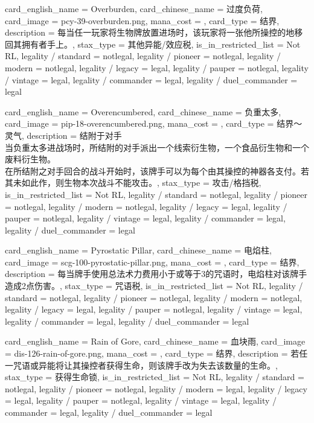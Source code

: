 \documentclass[lang = cn, color = black, 10pt]{AllThatStax}
\begin{document}
\card
{
	card_english_name = {Overburden},
	card_chinese_name = {过度负荷},
	card_image = pcy-39-overburden.png,
	mana_cost = ,
	card_type = 结界,
	description = {每当任一玩家将生物牌放置进场时，该玩家将一张他所操控的地移回其拥有者手上。},
	stax_type = 其他异能/效应税,
	is_in_restricted_list = Not RL,
	legality / standard = notlegal,
	legality / pioneer = notlegal,
	legality / modern = notlegal,
	legality / legacy = legal,
	legality / pauper = notlegal,
	legality / vintage = legal,
	legality / commander = legal,
	legality / duel_commander = legal
}

\card
{
	card_english_name = {Overencumbered},
	card_chinese_name = {负重太多},
	card_image = pip-18-overencumbered.png,
	mana_cost = ,
	card_type = 结界～灵气,
	description = {结附于对手\\
当负重太多进战场时，所结附的对手派出一个线索衍生物，一个食品衍生物和一个废料衍生物。\\
在所结附之对手回合的战斗开始时，该牌手可以为每个由其操控的神器各支付。若其未如此作，则生物本次战斗不能攻击。},
	stax_type = 攻击/格挡税,
	is_in_restricted_list = Not RL,
	legality / standard = notlegal,
	legality / pioneer = notlegal,
	legality / modern = notlegal,
	legality / legacy = legal,
	legality / pauper = notlegal,
	legality / vintage = legal,
	legality / commander = legal,
	legality / duel_commander = legal
}

\card
{
	card_english_name = {Pyrostatic Pillar},
	card_chinese_name = {电焰柱},
	card_image = scg-100-pyrostatic-pillar.png,
	mana_cost = ,
	card_type = 结界,
	description = {每当牌手使用总法术力费用小于或等于3的咒语时，电焰柱对该牌手造成2点伤害。},
	stax_type = 咒语税,
	is_in_restricted_list = Not RL,
	legality / standard = notlegal,
	legality / pioneer = notlegal,
	legality / modern = notlegal,
	legality / legacy = legal,
	legality / pauper = notlegal,
	legality / vintage = legal,
	legality / commander = legal,
	legality / duel_commander = legal
}

\card
{
	card_english_name = {Rain of Gore},
	card_chinese_name = {血块雨},
	card_image = dis-126-rain-of-gore.png,
	mana_cost = ,
	card_type = 结界,
	description = {若任一咒语或异能将让其操控者获得生命，则该牌手改为失去该数量的生命。},
	stax_type = 获得生命锁,
	is_in_restricted_list = Not RL,
	legality / standard = notlegal,
	legality / pioneer = notlegal,
	legality / modern = legal,
	legality / legacy = legal,
	legality / pauper = notlegal,
	legality / vintage = legal,
	legality / commander = legal,
	legality / duel_commander = legal
}
\end{document}
